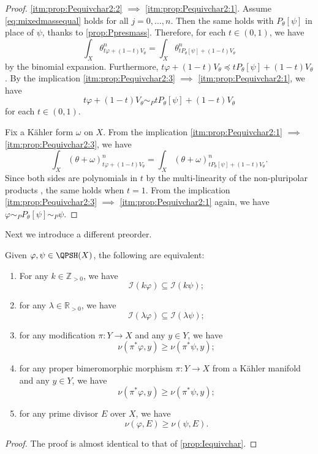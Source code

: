 \begin{proof}
    \ref{itm:prop:Pequivchar2:2} $\implies$ \ref{itm:prop:Pequivchar2:1}. Assume \eqref{eq:mixedmassequal} holds for all $j=0,\ldots,n$. Then the same holds with $P_{\theta}[\psi]$ in place of $\psi$, thanks to \cref{prop:Ppresmass}.
    Therefore, for each $t\in (0,1)$, we have
    \[
        \int_X \theta_{t\varphi+(1-t)V_{\theta}}^n=  \int_X \theta_{tP_{\theta}[\psi]+(1-t)V_{\theta}}^n
    \]
    by the binomial expansion. Furthermore, $t\varphi+(1-t)V_{\theta}\preceq tP_{\theta}[\psi]+(1-t)V_{\theta}$.
    By the implication \ref{itm:prop:Pequivchar2:3} $\implies$ \ref{itm:prop:Pequivchar2:1}, we have
    \[
        t\varphi+(1-t)V_{\theta}\sim_P t P_{\theta}[\psi]+(1-t)V_{\theta}
    \]
    for each $t\in (0,1)$.

    Fix a Kähler form $\omega$ on $X$.
    From the implication \ref{itm:prop:Pequivchar2:1} $\implies$ \ref{itm:prop:Pequivchar2:3}, we have
    \[
        \int_X (\theta+\omega)_{t\varphi+(1-t)V_{\theta}}^n=  \int_X (\theta+\omega)_{tP_{\theta}[\psi]+(1-t)V_{\theta}}^n.
    \]
    Since both sides are polynomials in $t$ by the multi-linearity of the non-pluripolar products , the same holds when $t=1$. From the implication \ref{itm:prop:Pequivchar2:3} $\implies$ \ref{itm:prop:Pequivchar2:1} again, we have $\varphi\sim_P P_{\theta}[\psi]\sim_P \psi$.
\end{proof}



Next we introduce a different preorder.
\begin{proposition}\label{prop:Iequivchar2}
    Given $\varphi,\psi\in \QPSH(X)$, the following are equivalent:
    \begin{enumerate}
        \item\label{itm:prop:Iequivchar2:1} For any $k\in \mathbb{Z}_{>0}$, we have
        \[
            \mathcal{I}(k\varphi)\subseteq\mathcal{I}(k\psi);
        \]
        \item\label{itm:prop:Iequivchar2:2} for any $\lambda\in \mathbb{R}_{>0}$, we have
            \[
            \mathcal{I}(\lambda\varphi)\subseteq\mathcal{I}(\lambda\psi);
            \]
        \item\label{itm:prop:Iequivchar2:3} for any modification $\pi\colon Y\rightarrow X$ and any $y\in Y$, we have
            \[
                \nu(\pi^*\varphi,y)\geq \nu(\pi^*\psi,y);
            \]
        \item\label{itm:prop:Iequivchar2:4} for any proper bimeromorphic morphism $\pi\colon Y\rightarrow X$ from a Kähler manifold and any $y\in Y$, we have
            \[
                \nu(\pi^*\varphi,y)\geq \nu(\pi^*\psi,y);
            \]
        \item\label{itm:prop:Iequivchar2:5} for any prime divisor $E$ over $X$, we have
            \[
                \nu(\varphi,E)\geq \nu(\psi,E).
            \]
    \end{enumerate}
\end{proposition}
\begin{proof}
    The proof is almost identical to that of \cref{prop:Iequivchar}.
\end{proof}

